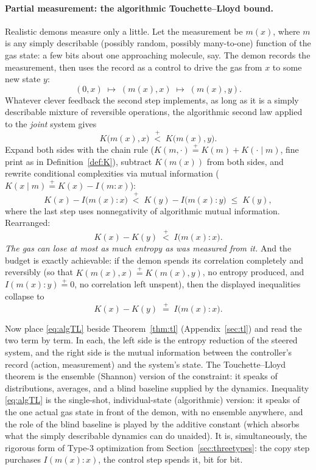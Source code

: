 \documentclass[10pt]{article}
\theoremstyle{definition}
\theoremstyle{remark}
\newcommand{\plt}{\mathrel{\stackrel{+}{<}}}
\newcommand{\peq}{\mathrel{\stackrel{+}{=}}}
\begin{document}
\paragraph{Partial measurement: the algorithmic Touchette--Lloyd bound.} Realistic demons measure only a little. Let the measurement be $m(x)$, where $m$ is any simply describable (possibly random, possibly many-to-one) function of the gas state: a few bits about one approaching molecule, say. The demon records the measurement, then uses the record as a control to drive the gas from $x$ to some new state $y$:
\[
(0, x) \;\mapsto\; (m(x), x) \;\mapsto\; (m(x), y).
\]
Whatever clever feedback the second step implements, as long as it is a simply describable mixture of reversible operations, the algorithmic second law applied to the \emph{joint} system gives
\[
K\big(m(x), x\big) \;\plt\; K\big(m(x), y\big).
\]
Expand both sides with the chain rule ($K(m,\cdot) \peq K(m) + K(\cdot \mid m)$, fine print as in Definition~\ref{def:K}), subtract $K(m(x))$ from both sides, and rewrite conditional complexities via mutual information ($K(x \mid m) \peq K(x) - I(m : x)$):
\[
K(x) - I\big(m(x) : x\big) \;\plt\; K(y) - I\big(m(x) : y\big) \;\le\; K(y),
\]
where the last step uses nonnegativity of algorithmic mutual information. Rearranged:
\begin{equation}
\label{eq:algTL}
\boxed{\;K(x) - K(y) \;\plt\; I\big(m(x) : x\big).\;}
\end{equation}
\emph{The gas can lose at most as much entropy as was measured from it.} And the budget is exactly achievable: if the demon spends its correlation completely and reversibly (so that $K(m(x), x) \peq K(m(x), y)$, no entropy produced, and $I(m(x) : y) \peq 0$, no correlation left unspent), then the displayed inequalities collapse to
\[
K(x) - K(y) \;\peq\; I\big(m(x) : x\big).
\]

Now place \eqref{eq:algTL} beside Theorem~\ref{thm:tl} (Appendix~\ref{sec:tl}) and read the two term by term. In each, the left side is the entropy reduction of the steered system, and the right side is the mutual information between the controller's record (action, measurement) and the system's state. The Touchette--Lloyd theorem is the ensemble (Shannon) version of the constraint: it speaks of distributions, averages, and a blind baseline supplied by the dynamics. Inequality \eqref{eq:algTL} is the single-shot, individual-state (algorithmic) version: it speaks of the one actual gas state in front of the demon, with no ensemble anywhere, and the role of the blind baseline is played by the additive constant (which absorbs what the simply describable dynamics can do unaided). It is, simultaneously, the rigorous form of Type-3 optimization from Section~\ref{sec:threetypes}: the copy step purchases $I(m(x):x)$, the control step spends it, bit for bit.
\end{document}
